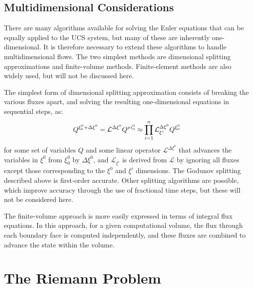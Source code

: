 \subsection{Multidimensional Considerations}
\label{sec:UCS-multidimensional}
There are many algorithms available for solving the Euler equations that can be equally applied to the UCS system, but many of these are inherently one-dimensional. It is therefore necessary to extend these algorithms to handle multidimensional flows. The two simplest methods are dimensional splitting approximations and finite-volume methods. Finite-element methods are also widely used, but will not be discussed here.

The simplest form of dimensional splitting approximation consists of breaking the various fluxes apart, and solving the resulting one-dimensional equations in sequential steps, as:
\[Q^{\xi^0_0+\Delta\xi^0}=\mathcal L^{\Delta\xi^0} Q^{\\xi^0_0} \approx \prod_{i=1}^n \mathcal L_{\xi^i}^{\Delta\xi^0} Q^{\xi^0_0}
\]
for some set of variables $Q$ and some linear operator $\mathcal L^{\Delta\xi^0}$ that advances the variables in $\xi^0$ from $\xi^0_0$ by $\Delta\xi^0$, and $\mathcal L_{\xi^i}$ is derived from $\mathcal L$ by ignoring all fluxes except those corresponding to the $\xi^0$ and $\xi^i$ dimensions. The Godunov splitting described above is first-order accurate. Other splitting algorithms are possible, which improve accuracy through the use of fractional time steps, but these will not be considered here.

The finite-volume approach is more easily expressed in terms of integral flux equations. In this approach, for a given computational volume, the flux through each boundary face is computed independently, and these fluxes are combined to advance the state within the volume. 

\section{The Riemann Problem}
\label{sec:UCS-Riemann}

